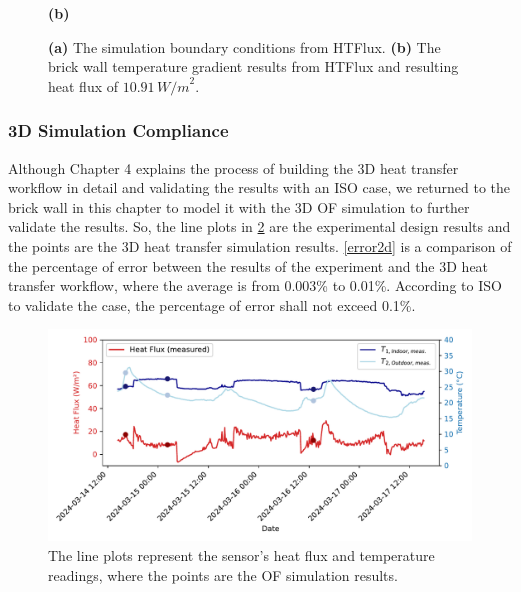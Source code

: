 \begin{figure}[H]
\begin{minipage}{0.49\textwidth}
  \textbf{(b)}
\end{minipage}
\caption[2D HTFlux Boundary conditions]{\textbf{(a)} The simulation boundary conditions from HTFlux. \textbf{(b)} The brick wall temperature gradient results from HTFlux and resulting heat flux of \( 10.91 \, {W/m}^2 \). }
\label{2dconst}
\end{figure}


\subsubsection{3D Simulation Compliance}\label{3dbrick}
Although Chapter 4 explains the process of building the 3D heat transfer workflow in detail and validating the results with an ISO case, we returned to the brick wall in this chapter to model it with the 3D \gls{OF} simulation to further validate the results. So, the line plots in \ref{fig:expr} are the experimental design results and the points are the 3D heat transfer simulation results. \ref{error2d} is a comparison of the percentage of error between the results of the experiment and the 3D heat transfer workflow, where the average is from 0.003\% to 0.01\%.
According to ISO \cite{ISO} to validate the case, the percentage of error shall not exceed 0.1\%.

\begin{figure}[tb]
     \centering
    \includegraphics[width=1\linewidth, trim= 0.2cm 0.2cm 0.2cm 0.2cm, clip=true]{Figures/Validation}
     \caption[2D Experimental Report Plot]{The line plots represent the sensor's heat flux and temperature readings, where the points are the \gls{OF} simulation results.}
   \label{fig:expr}
 \end{figure}





